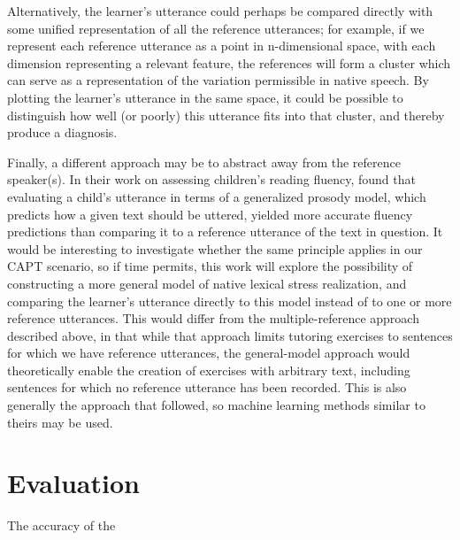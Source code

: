 	Alternatively, the learner's utterance could perhaps be compared directly with some unified representation of all the reference utterances; for example, if we represent each reference utterance as a point in n-dimensional space, with each dimension representing a relevant feature, the references will form a cluster which can serve as a representation of the variation permissible in native speech. By plotting the learner's utterance in the same space, it could be possible to distinguish how well (or poorly) this utterance fits into that cluster, and thereby produce a diagnosis.

	
	Finally, a different approach may be to abstract away from the reference speaker(s). In their work on assessing children's reading fluency, \textcite{Duong2011} found that evaluating a child's utterance in terms of a generalized prosody model, which predicts how a given text should be uttered, yielded more accurate fluency predictions than comparing it to a reference utterance of the text in question. It would be interesting to investigate whether the same principle applies in our CAPT scenario, so if time permits, this work will explore the possibility of constructing a more general model of native lexical stress realization, and comparing the learner's utterance directly to this model instead of to one or more reference utterances. This would differ from the multiple-reference approach described 
above,
in that while that approach limits tutoring exercises to sentences for which we have reference utterances, the general-model approach would theoretically enable the creation of exercises with arbitrary text, including sentences for which no reference utterance has been recorded. This is also generally the approach that \textcite{Shahin2012a,Kim2011} followed, so machine learning methods similar to theirs may be used.

\section{Evaluation}
\label{sec:diag:eval}

The accuracy of the


